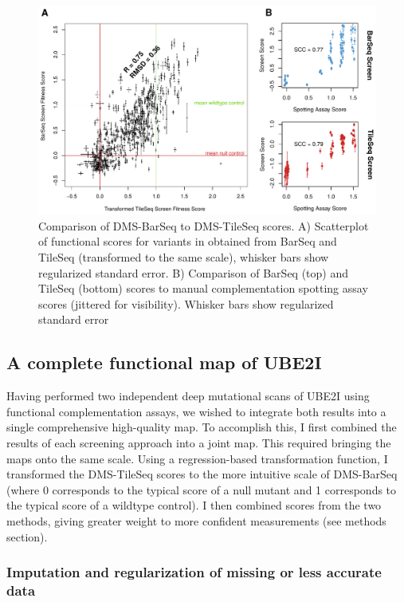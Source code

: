 \begin{figure}[h!]
	\centering
	\includegraphics[width=.9\textwidth]{img/barVtile.pdf}
	\caption{Comparison of DMS-BarSeq to DMS-TileSeq scores. A) Scatterplot of functional scores for variants in obtained from BarSeq and TileSeq (transformed to the same scale), whisker bars show regularized standard error. B) Comparison of BarSeq (top) and TileSeq (bottom) scores to manual complementation spotting assay scores (jittered for visibility). Whisker bars show regularized standard error}
	\label{fig:barVtile}
\end{figure}

\subsection{A complete functional map of UBE2I}

Having performed two independent deep mutational scans of UBE2I using functional complementation assays, we wished to integrate both results into a single comprehensive high-quality map. To accomplish this, I first combined the results of each screening approach into a joint map.  This required bringing the maps onto the same scale. Using a regression-based transformation function, I transformed the DMS-TileSeq scores to the more intuitive scale of DMS-BarSeq (where 0 corresponds to the typical score of a null mutant and 1 corresponds to the typical score of a wildtype control). I then combined scores from the two methods, giving greater weight to more confident measurements (see methods section).

\subsubsection{Imputation and regularization of missing or less accurate data}

